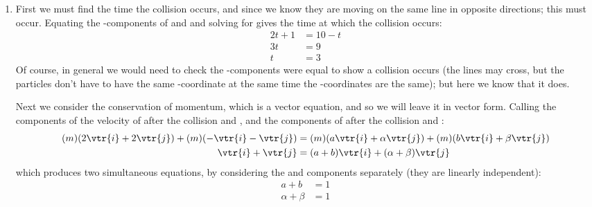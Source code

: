 \begin{problem}[A1988FMIVQ1a]
{\begin{enumerate}
A more rigorous method would be to consider the position vectors as two parametric equations for  and , then to find  and  then to use the Chain Rule to find
\begin{equation*} 
\frac{\d y}{\d x} = \frac{\left(\frac{\d y}{\d t}\right)}{\left( \frac{\d x}{\d t} \right)} = m
\end{equation*} 
for each particle. In both cases it comes out as , and then we find the intercept, , as above to show the particles move along a line of the form  where  and .
	\item First we must find the time the collision occurs, and since we know they are moving on the same line in opposite directions; this must occur. Equating the -components of  and  and solving for  gives the time at which the collision occurs:
\begin{eqnarray*} 
2t + 1 &= 10 -t \\ 
3t &= 9 \\ 
t &= 3 
\end{eqnarray*} Of course, in general we would need to check the -components were equal to show a collision occurs (the lines may cross, but the particles don't have to have the same -coordinate at the same time the -coordinates are the same); but here we know that it does.

Next we consider the conservation of momentum, which is a vector equation, and so we will leave it in vector form. Calling the components of the velocity of  after the collision  and \vari{\alpha}, and the components of  after the collision  and \vari{\beta}:
\begin{eqnarray*} 
(m)(2\vtr{i} + 2\vtr{j}) + (m)(-\vtr{i} - \vtr{j}) &= (m)(a\vtr{i} + \alpha\vtr{j}) + (m)(b\vtr{i} + \beta\vtr{j}) \\ 
\vtr{i} + \vtr{j} &= (a + b)\vtr{i} + (\alpha + \beta)\vtr{j}
\end{eqnarray*}
which produces two simultaneous equations, by considering the  and  components separately (they are linearly independent):
\begin{eqnarray} 
a + b &= 1 \label{CoM_vtr_i} \\ 
\alpha + \beta &= 1 \label{CoM_vtr_j} 
\end{eqnarray}


\end{enumerate}}
\end{problem}
